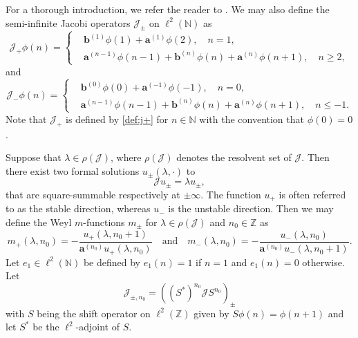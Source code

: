 \documentclass[a4paper,reqno,twoside]{amsart}
\numberwithin{equation}{section}
\theoremstyle{definition}
\newcommand{\bseq}[2]{{\bm{#1}^{(#2)}}}
\newcommand{\<}{\ensuremath \leq}
\renewcommand{\>}{\ensuremath \geq}
\begin{document}
For a thorough introduction,  we refer the reader to \cite{damanik.fillman2022OneDimensional,Teschl1999-dz}. We may also define the semi-infinite Jacobi operators $\mathcal{J}_\pm$ on $\ell^2(\mathbb{N})$ as
\begin{equation} \label{def:j+}
    \mathcal{J}_+\phi(n) = \begin{cases} &\bseq{b}{1}\phi(1) + \bseq{a}{1}\phi(2),\quad n = 1,\\
        &\bseq{a}{n-1}\phi(n-1) + \bseq{b}{n}\phi(n) + \bseq{a}{n}\phi(n+1), \quad n\geq 2,
    \end{cases}
\end{equation}
and
\begin{equation}
    \mathcal{J}_-\phi(n) = \begin{cases} &\bseq{b}{0}\phi(0) + \bseq{a}{-1}\phi(-1),\quad n = 0,\\
        &\bseq{a}{n-1}\phi(n-1) + \bseq{b}{n}\phi(n) + \bseq{a}{n}\phi(n+1), \quad n\leq -1.
    \end{cases}
\end{equation}
Note that $ \mathcal{J}_+$ is defined by \eqref{def:j+} for $n \in \mathbb{N}$ with the convention that $\phi(0)=0$. 

Suppose that $\lambda\in\rho(\mathcal{J})$, where $\rho(\mathcal{J})$ denotes the resolvent set of $\mathcal{J}$. Then there exist two formal solutions $u_\pm(\lambda, \cdot)$ to 
\begin{equation*}
    \mathcal{J}u_\pm = \lambda u_\pm,
\end{equation*}
that are square-summable respectively at $\pm\infty$. The function $u_+$ is often referred to as the stable direction, whereas $u_-$ is the unstable direction. Then we may define the Weyl $m$-functions $m_\pm$ for $\lambda \in \rho(\mathcal{J})$ and $n_0\in \mathbb{Z}$ as
\begin{equation}\label{eq: weyl1}
    m_+(\lambda,n_0) = -\frac{u_+(\lambda,n_0 +1)}{\bseq{a}{n_0}u_+(\lambda,n_0 )} \quad \text{and}\quad m_-(\lambda,n_0) = -\frac{u_-(\lambda,n_0)}{\bseq{a}{n_0}u_-(\lambda,n_0 +1)}.
\end{equation}
Let $e_1 \in \ell^2(\mathbb{N})$ be defined by $e_1(n)= 1$ if $n=1$ and $e_1(n)=0$ otherwise. Let $$\mathcal{J}_{\pm,n_0} = ((S^{*})^{n_0} \mathcal{J} S^{n_0})_\pm$$ with $S$ being the shift operator on $\ell^2(\mathbb{Z})$ given by $S\phi(n)= \phi(n+1)$ and let $S^*$ be the $\ell^2$-adjoint of $S$. 
\end{document}
